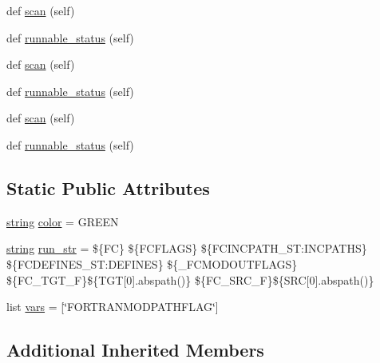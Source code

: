 \begin{DoxyCompactItemize}
\item 
def \hyperlink{classwaflib_1_1_tools_1_1fc_1_1fc_a6d914d7b3fbabb00177614858b7a2228}{scan} (self)
\item 
def \hyperlink{classwaflib_1_1_tools_1_1fc_1_1fc_aeef17ac252180b84177f3ba9a323a9f8}{runnable\+\_\+status} (self)
\item 
def \hyperlink{classwaflib_1_1_tools_1_1fc_1_1fc_a6d914d7b3fbabb00177614858b7a2228}{scan} (self)
\item 
def \hyperlink{classwaflib_1_1_tools_1_1fc_1_1fc_aeef17ac252180b84177f3ba9a323a9f8}{runnable\+\_\+status} (self)
\item 
def \hyperlink{classwaflib_1_1_tools_1_1fc_1_1fc_a6d914d7b3fbabb00177614858b7a2228}{scan} (self)
\item 
def \hyperlink{classwaflib_1_1_tools_1_1fc_1_1fc_aeef17ac252180b84177f3ba9a323a9f8}{runnable\+\_\+status} (self)
\end{DoxyCompactItemize}
\subsection*{Static Public Attributes}
\begin{DoxyCompactItemize}
\item 
\hyperlink{test__lib_f_l_a_c_2format_8c_ab02026ad0de9fb6c1b4233deb0a00c75}{string} \hyperlink{classwaflib_1_1_tools_1_1fc_1_1fc_aa58006cfe00e50feaf77bbac7608136e}{color} = \textquotesingle{}G\+R\+E\+EN\textquotesingle{}
\item 
\hyperlink{test__lib_f_l_a_c_2format_8c_ab02026ad0de9fb6c1b4233deb0a00c75}{string} \hyperlink{classwaflib_1_1_tools_1_1fc_1_1fc_af7f4ff0dcdc7c05d3d34c1b99c736f09}{run\+\_\+str} = \textquotesingle{}\$\{FC\} \$\{F\+C\+F\+L\+A\+GS\} \$\{F\+C\+I\+N\+C\+P\+A\+T\+H\+\_\+\+S\+T\+:\+I\+N\+C\+P\+A\+T\+HS\} \$\{F\+C\+D\+E\+F\+I\+N\+E\+S\+\_\+\+S\+T\+:\+D\+E\+F\+I\+N\+ES\} \$\{\+\_\+\+F\+C\+M\+O\+D\+O\+U\+T\+F\+L\+A\+GS\} \$\{F\+C\+\_\+\+T\+G\+T\+\_\+F\}\$\{T\+GT\mbox{[}0\mbox{]}.abspath()\} \$\{F\+C\+\_\+\+S\+R\+C\+\_\+F\}\$\{S\+RC\mbox{[}0\mbox{]}.abspath()\}\textquotesingle{}
\item 
list \hyperlink{classwaflib_1_1_tools_1_1fc_1_1fc_a0db5febe46e2052fbdd5ecef95049a2b}{vars} = \mbox{[}\char`\"{}F\+O\+R\+T\+R\+A\+N\+M\+O\+D\+P\+A\+T\+H\+F\+L\+AG\char`\"{}\mbox{]}
\end{DoxyCompactItemize}
\subsection*{Additional Inherited Members}


